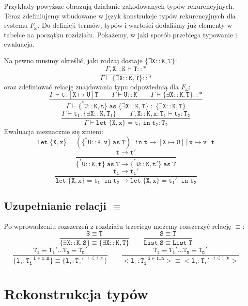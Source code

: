 \documentclass[11pt,leqno]{article}
\begin{document}
\normalsize{
Przykłady powyższe obrazują działanie zakodowanych typów rekurencyjnych. Teraz zdefiniujemy wbudowane w język konstrukcje typów rekurencyjnych dla systemu $F_\omega$. Do definicji termów, typów i wartości dodaliśmy już elementy w tabelce na początku rozdziału. Pokażemy, w jaki sposób przebiega typowanie i ewaluacja. \\
}


Na pewno musimy określić, jaki rodzaj dostaje $\mathtt{\{\exists X::K,T\}}$:
 	\[\mathtt{ \frac{\Gamma,X::K \vdash T::\ast}{\Gamma \vdash \{\exists X::K,T\}::\ast}
		}
	\]
oraz zdefiniować relację znajdowania typu odpowiednią dla $F_\omega$:
 	\[\mathtt{ \frac{\Gamma \vdash t:[X \mapsto U]T\hspace{2em}\Gamma \vdash U::K \hspace{2em}\Gamma \vdash \{\exists X::K,T\}::\ast}{\Gamma \vdash \{^*U::K,t\}\;as\;\{\exists X::K,T\} \; : \; \{\exists X::K,T\}}
		}
	\]
 	\[\mathtt{ \frac{\Gamma \vdash t_1:\{\exists X::K,T_1\}\hspace{2em}\Gamma,X::K,x:T_1 \vdash t_2:T_2}{\Gamma \vdash let\;\{X,x\}=t_1\;in\;t_2:T_2}
		}
	\]
Ewaluacja nieznacznie się zmieni:
 	\[\mathtt{ let\;\{X,x\}=(\{^*U::K,v\}\;as\;T)\;\;in\;t \longrightarrow [X \mapsto U][x \mapsto v]t
		}
	\]
 	\[\mathtt{ \frac{t \longrightarrow t'}{\{^*U::K,t\}\;as\;T \longrightarrow \{^*U::K,t'\}\;as\;T}
		}
	\]
 	\[\mathtt{ \frac{t_1\longrightarrow t_1'}{let\;\{X,x\}=t_1\;\;in\;t_2 \longrightarrow let\;\{X,x\}=t_1'\;\;in\;t_2}
		}
	\]

\subsection{Uzupełnianie relacji $\mathtt{\equiv}$}

Po wprowadzeniu rozszerzeń z rozdziału trzeciego możemy rozszerzyć relację $\mathtt{\equiv}$:
        \[\mathtt{ \frac{S \equiv T}{\{\exists X::K,S\} \equiv \{\exists X::K,T\}}
                   \qquad
                   \frac{S \equiv T}{List\;S \equiv List\;T}
		}
	\]
        \[\mathtt{ \frac{T_1 \equiv T_1' \dots T_n \equiv T_n'}{\{l_i:T_i^{\;\;\;i \in 1..n}\} \equiv \{l_i:T_i'^{\;\;\;i \in 1..n}\}}
                   \qquad
                   \frac{T_1 \equiv T_1' \dots T_n \equiv T_n'}{<l_i:T_i^{\;\;\;i \in 1..n}> \equiv <l_i:T_i'^{\;\;\;i \in 1..n}>}
		}
	\]
\section{Rekonstrukcja typów}
\end{document}
